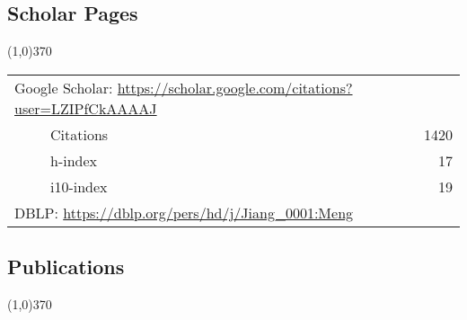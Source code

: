 \documentclass[10pt]{article}
\begin{document}
\vspace{-0.6cm}
\subsection{\sc Scholar Pages}
\vspace{-0.4cm} \line(1,0){370} \vspace{-0.1cm}

\begin{table}[h!]
\begin{tabular*}{12.7cm}{p{11.65cm}r}
\multicolumn{2}{l}{Google Scholar: \url{https://scholar.google.com/citations?user=LZIPfCkAAAAJ}} \\
~~~~~Citations&1420 \\
~~~~~h-index&17 \\
~~~~~i10-index&19 \\
\multicolumn{2}{l}{DBLP: \url{https://dblp.org/pers/hd/j/Jiang\_0001:Meng}} \\
\end{tabular*}
\end{table}

\vspace{-0.6cm}
\subsection{}
\subsection{\sc Publications}
\vspace{-0.4cm} \line(1,0){370} \vspace{-0.1cm}
\end{document}
